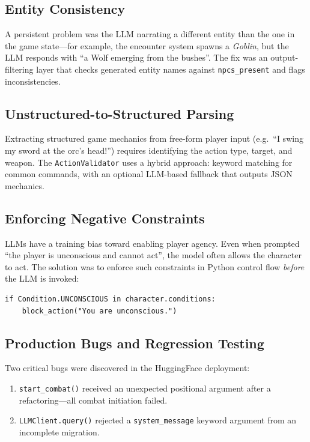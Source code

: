 \documentclass[12pt,a4paper]{article}
\begin{document}
\subsection{Entity Consistency}

A persistent problem was the LLM narrating a different entity than the one
in the game state---for example, the encounter system spawns a
\emph{Goblin}, but the LLM responds with ``a Wolf emerging from the
bushes''. The fix was an output-filtering layer that checks generated
entity names against \texttt{npcs\_present} and flags inconsistencies.

\subsection{Unstructured-to-Structured Parsing}

Extracting structured game mechanics from free-form player input (e.g.\
``I swing my sword at the orc's head!'') requires identifying the action
type, target, and weapon. The \texttt{ActionValidator} uses a hybrid
approach: keyword matching for common commands, with an optional LLM-based
fallback that outputs JSON mechanics.

\subsection{Enforcing Negative Constraints}

LLMs have a training bias toward enabling player agency. Even when prompted
``the player is unconscious and cannot act'', the model often allows the
character to act. The solution was to enforce such constraints in Python
control flow \emph{before} the LLM is invoked:

\begin{lstlisting}
if Condition.UNCONSCIOUS in character.conditions:
    block_action("You are unconscious.")
\end{lstlisting}

\subsection{Production Bugs and Regression Testing}

Two critical bugs were discovered in the HuggingFace deployment:
\begin{enumerate}[noitemsep]
    \item \texttt{start\_combat()} received an unexpected positional argument
          after a refactoring---all combat initiation failed.
    \item \texttt{LLMClient.query()} rejected a \texttt{system\_message}
          keyword argument from an incomplete migration.
\end{enumerate}
\end{document}
